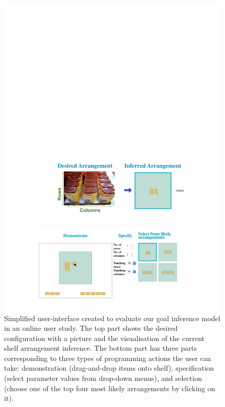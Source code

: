 \begin{figure}[htp]
	\centering
	\includegraphics[width=0.9\linewidth]{figures/amt-gui}
	\caption{Simplified user-interface created to evaluate our goal inference model in an online user study. The top part shows the desired configuration with a picture and the visualisation of the current shelf arrangement inference. The bottom part has three parts corresponding to three types of programming actions the user can take: demonstration (drag-and-drop items onto shelf), specification (select parameter values from drop-down menus), and selection (choose one of the top four most likely arrangements by clicking on it).}
	\label{fig:amt-gui}
\end{figure}

